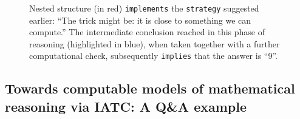 \documentclass[smallextended,oneside]{svjour3}       %
\begin{document}
{
\renewcommand{\bottomfraction}{.9}
\begin{figure}[t]
{\centering
{}


\par}
\caption{Nested structure (in red) \texttt{implements} the \texttt{strategy} suggested earlier:
``The trick might be: it is close to
something we can compute.''  The intermediate conclusion reached in this phase of reasoning (highlighted in blue), when taken together with a further computational check, subsequently \texttt{implies} that the answer is ``9''. \label{fig:nested}}
\end{figure}
}

\FloatBarrier
\subsection{Towards computable models of mathematical reasoning via IATC: A Q\&A example}\label{iatc-examples:mathoverflow}
\end{document}
